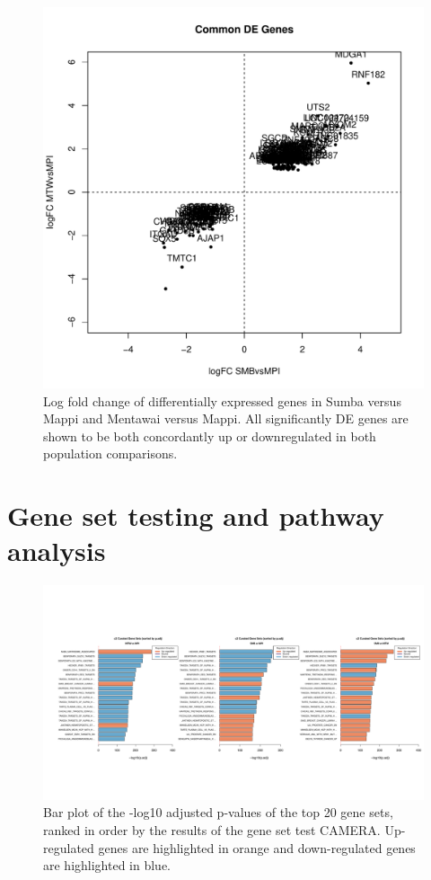 \documentclass[12pt,a4paper,titlepage,twoside,openright]{book}
\begin{document}
\begin{mainmatter}
{{\begin{figure}[htb!]
\centering
\includegraphics[width=\textwidth,height=\textheight,keepaspectratio]{Figures/logFC_commonMPIgenes_dupCor.pdf}
\caption{Log fold change of differentially expressed genes in Sumba versus Mappi and Mentawai versus Mappi. All significantly DE genes are shown to be both concordantly up or downregulated in both population comparisons.}
\label{fig:LogFC: Mappi vs Others}
\end{figure}

\section{Gene set testing and pathway analysis}

\begin{figure}[htb!]
\centering
\includegraphics[width=\textwidth,height=\textheight,keepaspectratio]{Figures/all_c2_barplots.pdf}
\caption{Bar plot of the -log10 adjusted p-values of the top 20 gene sets, ranked in order by the results of the gene set test CAMERA. Up-regulated genes are highlighted in orange and down-regulated genes are highlighted in blue.}
\label{fig:Variance Explained}
\end{figure}

}}
\end{mainmatter}
\end{document}
